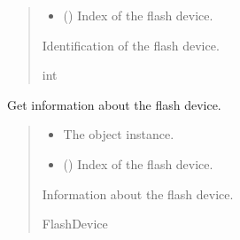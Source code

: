\documentclass[letterpaper,10pt,english]{sphinxmanual}
\begin{document}
\begin{fulllineitems}
\begin{fulllineitems}
\begin{quote}
\begin{description}
\begin{itemize}
\item {} 
\sphinxAtStartPar
{} () \textendash{} Index of the flash device.

\end{itemize}

\sphinxAtStartPar
Identification of the flash device.

\sphinxAtStartPar
int

\end{description}\end{quote}

\end{fulllineitems}


\begin{fulllineitems}
\label{\detokenize{cplddocs:management_flash.MngProgFlash.DeviceGetInfo}}
\pysigstartsignatures
{}
\pysigstopsignatures
\sphinxAtStartPar
Get information about the flash device.
\begin{quote}\begin{description}
\begin{itemize}
\item {} 
\sphinxAtStartPar
{} \textendash{} The object instance.

\item {} 
\sphinxAtStartPar
{} () \textendash{} Index of the flash device.

\end{itemize}

\sphinxAtStartPar
Information about the flash device.

\sphinxAtStartPar
FlashDevice

\end{description}\end{quote}

\end{fulllineitems}



\end{fulllineitems}
\end{document}

